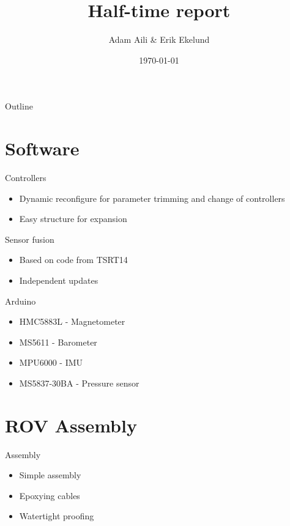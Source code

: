 \documentclass[11pt]{beamer}
\author{Adam Aili \& Erik Ekelund}
\title{Half-time report}
\date{\today}
\begin{document}
\begin{frame}
\titlepage
\end{frame}

\begin{frame}{Outline}
\tableofcontents
\end{frame}
\section{Software}
\begin{frame}{Controllers}
\begin{itemize}
\item Dynamic reconfigure for parameter trimming and change of controllers
\item Easy structure for expansion
\end{itemize}
\end{frame}

\begin{frame}{Sensor fusion}
\begin{itemize}
\item Based on code from TSRT14
\item Independent updates
\end{itemize}
\end{frame}

\begin{frame}{Arduino}
\begin{itemize}
\item HMC5883L - Magnetometer
\item MS5611 - Barometer
\item MPU6000 - IMU
\item MS5837-30BA - Pressure sensor
\end{itemize}
\end{frame}
\section{ROV Assembly}
\begin{frame}{Assembly}
\begin{itemize}
\item Simple assembly
\item Epoxying cables
\item Watertight proofing
\end{itemize}
\end{frame}
\end{document}
